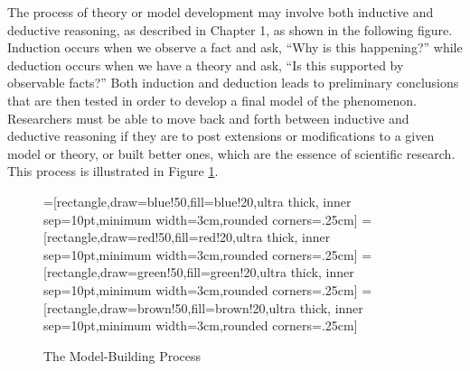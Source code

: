 The process of theory or model development may involve both inductive and deductive reasoning, as described in Chapter 1, as shown in the following figure. Induction occurs when we observe a fact and ask, ``Why is this happening?'' while deduction occurs when we have a theory and ask, ``Is this supported by observable facts?'' Both induction and deduction leads to preliminary conclusions that are then tested in order to develop a final model of the phenomenon. Researchers must be able to move back and forth between inductive and deductive reasoning if they are to post extensions or modifications to a given model or theory, or built better ones, which are the essence of scientific research. This process is illustrated in Figure \ref{02:fig04}.

\begin{center}
	\begin{figure}[H]
		=[rectangle,draw=blue!50,fill=blue!20,ultra thick,
		inner sep=10pt,minimum width=3cm,rounded corners=.25cm]
		=[rectangle,draw=red!50,fill=red!20,ultra thick,
		inner sep=10pt,minimum width=3cm,rounded corners=.25cm]
		=[rectangle,draw=green!50,fill=green!20,ultra thick,
		inner sep=10pt,minimum width=3cm,rounded corners=.25cm]
		=[rectangle,draw=brown!50,fill=brown!20,ultra thick,
		inner sep=10pt,minimum width=3cm,rounded corners=.25cm]
		\caption{The Model-Building Process}
		\label{02:fig04}
	\end{figure}
\end{center}

